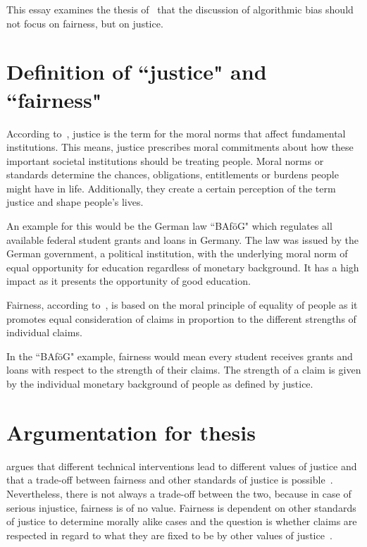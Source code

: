 
This essay examines the thesis of~\cite{vredenburgh} that the discussion of algorithmic bias should not focus on fairness, but on justice.

\section*{Definition of ``justice" and ``fairness" }

According to~\cite[][3, 11--12]{vredenburgh}, justice is the term for the moral norms that affect fundamental institutions.
This means, justice prescribes moral commitments about how these important societal institutions should be treating people.
Moral norms or standards determine the chances, obligations, entitlements or burdens people might have in life.
Additionally, they create a certain perception of the term justice and shape people's lives.

An example for this would be the German law ``BAföG" which regulates all available federal student grants and loans in Germany.
The law was issued by the German government, a political institution, with the underlying moral norm of equal opportunity for education regardless of monetary background.
It has a high impact as it presents the opportunity of good education.

Fairness, according to~\cite[][3, 13]{vredenburgh}, is based on the moral principle of equality of people as it promotes equal consideration of claims in proportion to the different strengths of individual claims.

In the ``BAföG" example, fairness would mean every student receives grants and loans with respect to the strength of their claims.
The strength of a claim is given by the individual monetary background of people as defined by justice.

\section*{Argumentation for thesis}

\cite{vredenburgh} argues that different technical interventions lead to different values of justice and that a trade-off between fairness and other standards of justice is possible~\parencite[][18]{vredenburgh}.
Nevertheless, there is not always a trade-off between the two, because in case of serious injustice, fairness is of no value.
Fairness is dependent on other standards of justice to determine morally alike cases and the question is whether claims are respected in regard to what they are fixed to be by other values of justice~\parencite[][18, 19]{vredenburgh}.

